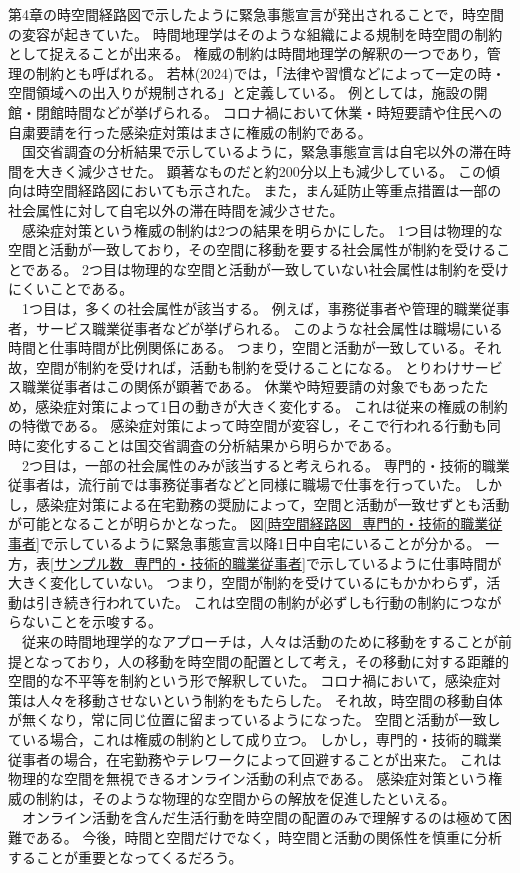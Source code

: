 \documentclass[paper={210mm,297mm},line_length=35zw,number_of_lines=31,head_space=30mm,gutter=40mm,baselineskip=2.0zw,headfoot_verticalposition=1.5zw]{jlreq}
\begin{document}
第4章の時空間経路図で示したように緊急事態宣言が発出されることで，時空間の変容が起きていた。
時間地理学はそのような組織による規制を時空間の制約として捉えることが出来る。
権威の制約は時間地理学の解釈の一つであり，管理の制約とも呼ばれる。
若林(2024)では，「法律や習慣などによって一定の時・空間領域への出入りが規制される」と定義している。
例としては，施設の開館・閉館時間などが挙げられる。
コロナ禍において休業・時短要請や住民への自粛要請を行った感染症対策はまさに権威の制約である。\\
　国交省調査の分析結果で示しているように，緊急事態宣言は自宅以外の滞在時間を大きく減少させた。
顕著なものだと約200分以上も減少している。
この傾向は時空間経路図においても示された。
また，まん延防止等重点措置は一部の社会属性に対して自宅以外の滞在時間を減少させた。\\
　感染症対策という権威の制約は2つの結果を明らかにした。
1つ目は物理的な空間と活動が一致しており，その空間に移動を要する社会属性が制約を受けることである。
2つ目は物理的な空間と活動が一致していない社会属性は制約を受けにくいことである。\\
　1つ目は，多くの社会属性が該当する。
例えば，事務従事者や管理的職業従事者，サービス職業従事者などが挙げられる。
このような社会属性は職場にいる時間と仕事時間が比例関係にある。
つまり，空間と活動が一致している。それ故，空間が制約を受ければ，活動も制約を受けることになる。
とりわけサービス職業従事者はこの関係が顕著である。
休業や時短要請の対象でもあったため，感染症対策によって1日の動きが大きく変化する。
これは従来の権威の制約の特徴である。
感染症対策によって時空間が変容し，そこで行われる行動も同時に変化することは国交省調査の分析結果から明らかである。\\
　2つ目は，一部の社会属性のみが該当すると考えられる。
専門的・技術的職業従事者は，流行前では事務従事者などと同様に職場で仕事を行っていた。
しかし，感染症対策による在宅勤務の奨励によって，空間と活動が一致せずとも活動が可能となることが明らかとなった。
図\ref{時空間経路図_専門的・技術的職業従事者}で示しているように緊急事態宣言以降1日中自宅にいることが分かる。
一方，表\ref{サンプル数_専門的・技術的職業従事者}で示しているように仕事時間が大きく変化していない。
つまり，空間が制約を受けているにもかかわらず，活動は引き続き行われていた。
これは空間の制約が必ずしも行動の制約につながらないことを示唆する。\\
　従来の時間地理学的なアプローチは，人々は活動のために移動をすることが前提となっており，人の移動を時空間の配置として考え，その移動に対する距離的空間的な不平等を制約という形で解釈していた。
コロナ禍において，感染症対策は人々を移動させないという制約をもたらした。
それ故，時空間の移動自体が無くなり，常に同じ位置に留まっているようになった。
空間と活動が一致している場合，これは権威の制約として成り立つ。
しかし，専門的・技術的職業従事者の場合，在宅勤務やテレワークによって回避することが出来た。
これは物理的な空間を無視できるオンライン活動の利点である。
感染症対策という権威の制約は，そのような物理的な空間からの解放を促進したといえる。\\
　オンライン活動を含んだ生活行動を時空間の配置のみで理解するのは極めて困難である。
今後，時間と空間だけでなく，時空間と活動の関係性を慎重に分析することが重要となってくるだろう。\\
\end{document}
